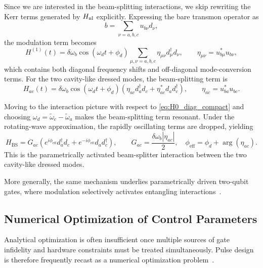 Since we are interested in the beam-splitting interactions, we skip rewriting the Kerr terms generated by \(H_{\rm nl}\) explicitly. Expressing the bare transmon operator as
\begin{equation}
    b = \sum_{\nu=a,b,c} u_{b\nu} d_\nu,
\end{equation}
the modulation term becomes
\begin{equation}
    H^{(1)}(t)
    =
    \delta\omega_b \cos(\omega_d t+\phi_d)
    \sum_{\mu,\nu=a,b,c}
    \eta_{\mu\nu} d_\mu^\dagger d_\nu,
    \qquad
    \eta_{\mu\nu}=u_{b\mu}^*u_{b\nu},
    \label{eq:H1_normalmode_compact}
\end{equation}
which contains both diagonal frequency shifts and off-diagonal mode-conversion terms. For the two cavity-like dressed modes, the beam-splitting term is
\begin{equation}
    H_{ac}(t)
    =
    \delta\omega_b \cos(\omega_d t+\phi_d)
    \left(
        \eta_{ac} d_a^\dagger d_c
        +
        \eta_{ac}^* d_a d_c^\dagger
    \right),
    \qquad
    \eta_{ac}=u_{ba}^*u_{bc}.
\end{equation}

Moving to the interaction picture with respect to \eqref{eq:H0_diag_compact} and choosing \(\omega_d=\tilde{\omega}_c-\tilde{\omega}_a\) makes the beam-splitting term resonant. Under the rotating-wave approximation, the rapidly oscillating terms are dropped, yielding
\begin{equation}
    H_{\mathrm{BS}}
    =
    G_{ac}
    \left(
        e^{i\phi_{\mathrm{eff}}} d_a^\dagger d_c
        +
        e^{-i\phi_{\mathrm{eff}}} d_a d_c^\dagger
    \right),
    \qquad
    G_{ac}=\frac{\delta\omega_b |\eta_{ac}|}{2},
    \quad
    \phi_{\mathrm{eff}}=\phi_d+\arg(\eta_{ac}).
\end{equation}
This is the parametrically activated beam-splitter interaction between the two cavity-like dressed modes. 

More generally, the same mechanism underlies parametrically driven two-qubit gates, where modulation selectively activates entangling interactions~\cite{Strand2013,Noguchi2020,Fasciati2024}.

\subsection{Numerical Optimization of Control Parameters}

Analytical optimization is often insufficient once multiple sources of gate infidelity and hardware constraints must be treated simultaneously. Pulse design is therefore frequently recast as a numerical optimization problem~\cite{Koch2022,Song2022,Werninghaus2021}. 

